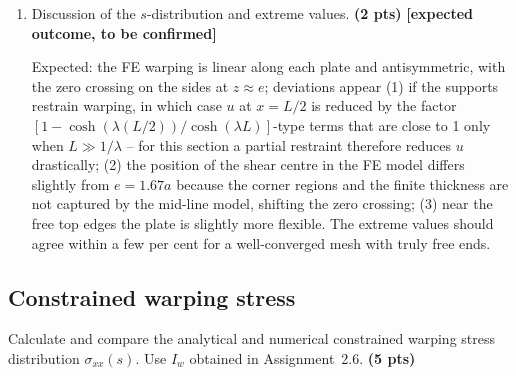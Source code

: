\begin{enumerate}[label=\roman*.]
  Plot UX along $s$ from the path export together with $u(s)$ of item~i.

  \item Discussion of the $s$-distribution and extreme values. \textbf{(2 pts)} \textbf{[expected outcome, to be confirmed]}

  Expected: the FE warping is linear along each plate and antisymmetric, with the zero crossing on the sides at $z\approx e$; deviations appear (1) if the supports restrain warping, in which case $u$ at $x=L/2$ is reduced by the factor $[1-\cosh(\lambda(L/2))/\cosh(\lambda L)]$-type terms that are close to 1 only when $L\gg1/\lambda$ -- for this section a partial restraint therefore reduces $u$ drastically; (2) the position of the shear centre in the FE model differs slightly from $e=1.67a$ because the corner regions and the finite thickness are not captured by the mid-line model, shifting the zero crossing; (3) near the free top edges the plate is slightly more flexible. The extreme values should agree within a few per cent for a well-converged mesh with truly free ends.
\end{enumerate}

\subsection{Constrained warping stress}

Calculate and compare the analytical and numerical constrained warping stress distribution $\sigma_{xx}(s)$. Use $I_w$ obtained in Assignment~2.6. \textbf{(5 pts)}

